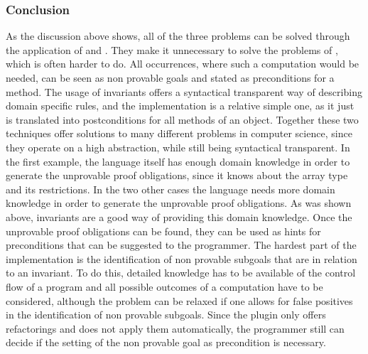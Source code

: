 \subsubsection{Conclusion}
As the discussion above shows, all of the three problems can be solved through the application of  and . They make it unnecessary to solve the problems of , which is often harder to do. All occurrences, where such a computation would be needed, can be seen as non provable goals and stated as preconditions for a method. The usage of invariants offers a syntactical transparent way of describing domain specific rules, and the implementation is a relative simple one, as it just is translated into postconditions for all methods of an object. Together these two techniques offer solutions to many different problems in computer science, since they operate on a high abstraction, while still being syntactical transparent.\newline 
In the first example, the language itself has enough domain knowledge in order to generate the unprovable proof obligations, since it knows about the array type and its restrictions. In the two other cases the language  needs more domain knowledge in order to generate the unprovable proof obligations. As was shown above, invariants are a good way of providing this domain knowledge.
Once the unprovable proof obligations can be found, they can be used as hints for preconditions that can be suggested to the programmer.\newline
The hardest part of the implementation is the identification of non provable subgoals that are in relation to an invariant. To do this, detailed knowledge has to be available of the control flow of a program and all possible outcomes of a computation have to be considered, although the problem can be relaxed if one allows for false positives in the identification of non provable subgoals. Since the plugin only offers refactorings and does not apply them automatically, the programmer still can decide if the setting of the non provable goal as precondition is necessary.  
